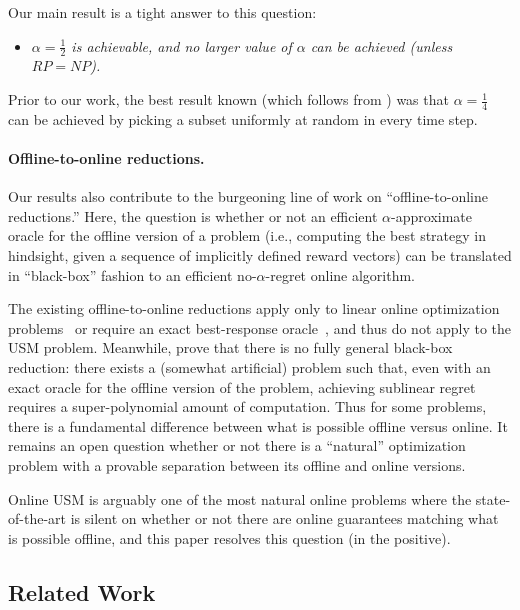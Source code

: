\documentclass[final,12pt]{colt2018}
\newcommand{\nar}{no-$\alpha$-regret\xspace}
\begin{document}
Our main result is a tight answer to this question: 
\begin{itemize}

\item [] {\em $\alpha =
\tfrac{1}{2}$ is achievable, and no larger value of $\alpha$ can be
achieved (unless $RP = NP$).}

\end{itemize}
Prior to our work, the best result known (which follows from
\cite{FMV11}) was that $\alpha = \tfrac 14$ can be achieved by picking a
subset uniformly at random in every time step.

\paragraph{Offline-to-online reductions.}
Our results also contribute to the burgeoning line of work on
``offline-to-online reductions.''  Here, the question is whether or
not an efficient $\alpha$-approximate oracle for the offline version of a
problem (i.e., computing the best strategy in hindsight, given a
sequence of implicitly defined reward vectors) can be
translated in ``black-box'' fashion to an efficient \nar online
algorithm. 

The existing offline-to-online reductions
apply only to linear online optimization
problems~\citep{AK08,FHT13,KV05,KKL09} or require
an exact best-response oracle~\citep{D+17,Z03}, and thus do not apply
to the USM problem.
Meanwhile, \cite{HK16} prove that there is no fully
general black-box reduction: there exists a (somewhat artificial)
problem such that, even with an exact oracle for the offline
version of the problem, achieving sublinear regret requires
a super-polynomial amount of computation.  Thus for some problems,
there is a fundamental difference between what is possible offline
versus online.  It remains an open question whether or not there is a
``natural'' optimization problem with a provable separation between
its offline and online versions.

Online USM is arguably one of the most natural online problems where
the state-of-the-art is silent on whether or not there are online
guarantees matching what is possible offline, and this paper resolves
this question (in the positive).

\subsection{Related Work}
\end{document}
